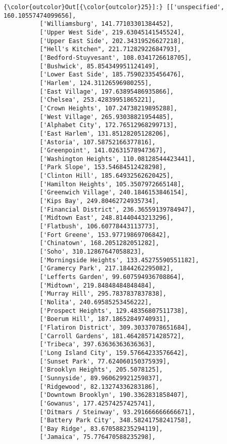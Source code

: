 \documentclass[11pt]{article}
\begin{document}
            \begin{Verbatim}[commandchars=\\\{\}]
{\color{outcolor}Out[{\color{outcolor}25}]:} [['unspecified', 160.10557474099656],
          ['Williamsburg', 141.77103301384452],
          ['Upper West Side', 219.63045141545524],
          ['Upper East Side', 202.34319526627218],
          ["Hell's Kitchen", 221.71282922684793],
          ['Bedford-Stuyvesant', 108.0341726618705],
          ['Bushwick', 85.854349951124149],
          ['Lower East Side', 185.75902335456476],
          ['Harlem', 124.31126596980255],
          ['East Village', 197.63895486935866],
          ['Chelsea', 253.42839951865221],
          ['Crown Heights', 107.24738219895288],
          ['West Village', 265.93038821954485],
          ['Alphabet City', 172.76512968299713],
          ['East Harlem', 131.85128205128206],
          ['Astoria', 107.58752166377816],
          ['Greenpoint', 141.02631578947367],
          ['Washington Heights', 110.08128544423441],
          ['Park Slope', 153.54684512428298],
          ['Clinton Hill', 185.64932562620425],
          ['Hamilton Heights', 105.3507972665148],
          ['Greenwich Village', 240.1846153846154],
          ['Kips Bay', 249.80462724935734],
          ['Financial District', 236.36559139784947],
          ['Midtown East', 248.81440443213296],
          ['Flatbush', 106.60778443113773],
          ['Fort Greene', 153.97719869706842],
          ['Chinatown', 168.2051282051282],
          ['Soho', 310.12867647058823],
          ['Morningside Heights', 133.45275590551182],
          ['Gramercy Park', 217.1844262295082],
          ['Lefferts Garden', 99.607594936708864],
          ['Midtown', 219.84848484848484],
          ['Murray Hill', 295.7837837837838],
          ['Nolita', 240.69585253456222],
          ['Prospect Heights', 129.48356807511738],
          ['Boerum Hill', 187.18652849740931],
          ['Flatiron District', 309.30337078651684],
          ['Carroll Gardens', 181.46428571428572],
          ['Tribeca', 397.63636363636363],
          ['Long Island City', 159.57664233576642],
          ['Sunset Park', 77.624060150375939],
          ['Brooklyn Heights', 205.5078125],
          ['Sunnyside', 89.960629921259837],
          ['Ridgewood', 82.13274336283186],
          ['Downtown Brooklyn', 190.3362831858407],
          ['Gowanus', 177.42574257425741],
          ['Ditmars / Steinway', 93.291666666666671],
          ['Battery Park City', 348.58241758241758],
          ['Bay Ridge', 83.670588235294119],
          ['Jamaica', 75.776470588235298],

\end{Verbatim}
\end{document}
